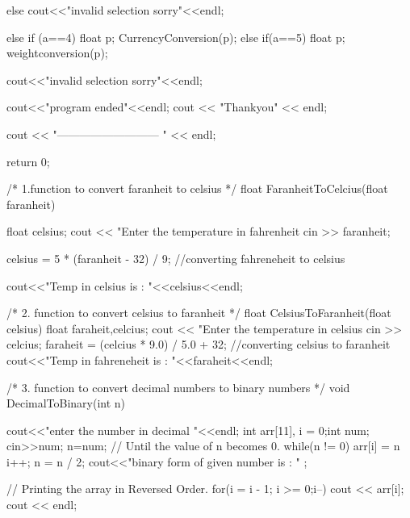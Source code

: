 \documentclass[12pt,a4paper]{article}
\begin{document}
{{{}

else
{
cout<<"invalid selection sorry"<<endl;
}




}



else if (a==4)
{
float p;
CurrencyConversion(p);
}
else if(a==5)
{
float p;
weightconversion(p);
}







{
cout<<"invalid selection sorry"<<endl;
}


cout<<"program ended"<<endl;
cout << "Thankyou" << endl;

cout << "--------------------------- " << endl;

return 0;
}






/*
1.function to convert faranheit to celsius
*/
float FaranheitToCelcius(float faranheit)
{ float celsius;
 cout << "Enter the temperature in fahrenheit
    cin >> faranheit;
  
       celsius = 5 * (faranheit - 32) / 9;           //converting fahreneheit to celsius 
     
     cout<<"Temp in celsius is : "<<celsius<<endl;
   
}






/*
2. function to convert celsius to faranheit 
*/
float CelsiusToFaranheit(float celsius)
{
float faraheit,celcius;
 cout << "Enter the temperature in celsius
    cin >> celcius;
   faraheit = (celcius * 9.0) / 5.0 + 32; //converting celsius to faranheit
     cout<<"Temp in fahreneheit is : "<<faraheit<<endl;
}




/*
3. function to convert decimal numbers to binary numbers
*/
void DecimalToBinary(int n)
{cout<<"enter the number in decimal "<<endl;
    	int arr[11], i = 0;int num;
        cin>>num;
    n=num;
    // Until the value of n becomes 0.
	while(n != 0){
		arr[i] = n %
		i++;
		n = n / 2;
	}
	cout<<"binary form of given number is : " ;

	// Printing the array in Reversed Order.
	for(i = i - 1; i >= 0;i--){
		cout << arr[i];
	}
	cout << endl;

}
\end{document}
